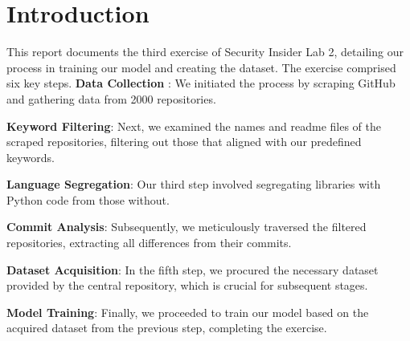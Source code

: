 \chapter{Introduction}\label{chap:introduction}

This report documents the third exercise of Security Insider Lab 2, detailing our process in training our model and creating the dataset. The exercise comprised six key steps.
\textbf{Data Collection} : We initiated the process by scraping GitHub and gathering data from 2000 repositories.

\textbf{Keyword Filtering}: Next, we examined the names and readme files of the scraped repositories, filtering out those that aligned with our predefined keywords.

\textbf{Language Segregation}: Our third step involved segregating libraries with Python code from those without.

\textbf{Commit Analysis}: Subsequently, we meticulously traversed the filtered repositories, extracting all differences from their commits.

\textbf{Dataset Acquisition}: In the fifth step, we procured the necessary dataset provided by the central repository, which is crucial for subsequent stages.

\textbf{Model Training}: Finally, we proceeded to train our model based on the acquired dataset from the previous step, completing the exercise.








